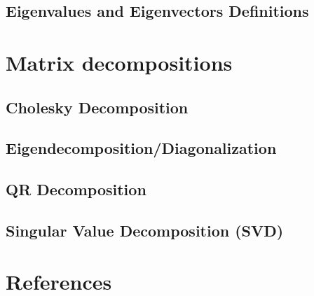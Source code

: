 \documentclass[11pt]{beamer}
\begin{document}
\subsection{Eigenvalues and Eigenvectors Definitions}


\section{Matrix decompositions}
\subsection{Cholesky Decomposition}


\subsection{Eigendecomposition/Diagonalization}

\subsection{QR Decomposition}


\subsection{Singular Value Decomposition (SVD)}



\section{References}

\end{document}

